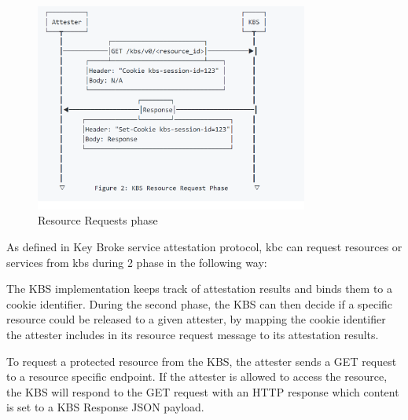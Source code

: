 \begin{figure}[H]
    \centering
    \includegraphics[width=0.8\textwidth]{images/resourcerequrie.PNG}
    \caption[Resource Requests phase]{Resource Requests phase}
    \label{fig:resourcerequrie}
\end{figure}
As defined in Key Broke service attestation protocol,  kbc can request resources or services from kbs during 2 phase in the following way:
\begin{displayquote}
    The KBS implementation keeps track of attestation results and binds them to a cookie identifier. During the second phase, the KBS can then decide if a specific resource could be released to a given attester, by mapping the cookie identifier the attester includes in 
    its resource request message to its attestation results.

    To request a protected resource from the KBS, the attester sends a GET request to a resource specific endpoint. If the attester is allowed to access the resource, the KBS will respond to the 
    GET request with an HTTP response which content is set to a KBS Response JSON payload.
\end{displayquote}


